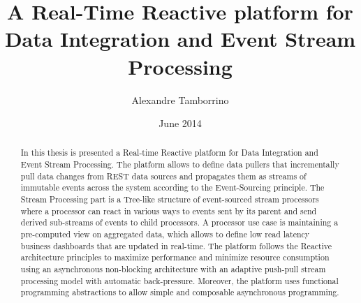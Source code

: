 \documentclass[a4paper,11pt]{kth-mag}
\title{A Real-Time Reactive platform for Data Integration and Event Stream Processing}
\author{Alexandre Tamborrino}
\date{June 2014}
\begin{document}
\frontmatter
\pagestyle{empty}
\removepagenumbers
\maketitle
{}

\begin{abstract}
In this thesis is presented a Real-time Reactive platform for Data Integration and Event Stream Processing. The platform allows to define data pullers that incrementally pull data changes from REST data sources and propagates them as streams of immutable events across the system according to the Event-Sourcing principle. The Stream Processing part is a Tree-like structure of event-sourced stream processors where a processor can react in various ways to events sent by its parent and send derived sub-streams of events to child processors. A processor use case is maintaining a pre-computed view on aggregated data, which allows to define low read latency business dashboards that are updated in real-time.
The platform follows the Reactive architecture principles to maximize performance and minimize resource consumption using an asynchronous non-blocking architecture with an adaptive push-pull stream processing model with automatic back-pressure. Moreover, the platform uses functional programming abstractions to allow simple and composable asynchronous programming.

\end{abstract}
\clearpage



\tableofcontents*

\mainmatter
\pagestyle{newchap}









\newpage
\printbibliography

\newpage
\listoffigures

\newpage
\listoflistings
\end{document}
